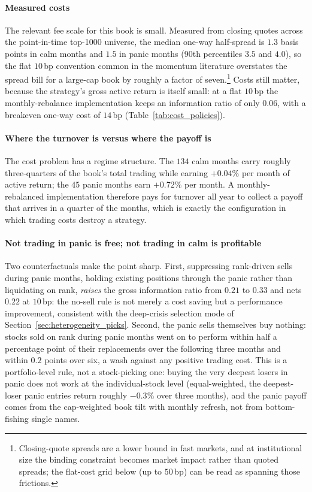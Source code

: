 \paragraph{Measured costs}
The relevant fee scale for this book is small. Measured from closing quotes across the point-in-time top-1000 universe, the median one-way half-spread is $1.3$ basis points in calm months and $1.5$ in panic months (90th percentiles $3.5$ and $4.0$), so the flat $10$\,bp convention common in the momentum literature overstates the spread bill for a large-cap book by roughly a factor of seven.\footnote{Closing-quote spreads are a lower bound in fast markets, and at institutional size the binding constraint becomes market impact rather than quoted spreads; the flat-cost grid below (up to $50$\,bp) can be read as spanning those frictions.} Costs still matter, because the strategy's gross active return is itself small: at a flat $10$\,bp the monthly-rebalance implementation keeps an information ratio of only $0.06$, with a breakeven one-way cost of $14$\,bp (Table~\ref{tab:cost_policies}).

\paragraph{Where the turnover is versus where the payoff is}
The cost problem has a regime structure. The $134$ calm months carry roughly three-quarters of the book's total trading while earning $+0.04\%$ per month of active return; the $45$ panic months earn $+0.72\%$ per month. A monthly-rebalanced implementation therefore pays for turnover all year to collect a payoff that arrives in a quarter of the months, which is exactly the configuration in which trading costs destroy a strategy.

\paragraph{Not trading in panic is free; not trading in calm is profitable}
Two counterfactuals make the point sharp. First, suppressing rank-driven sells during panic months, holding existing positions through the panic rather than liquidating on rank, \emph{raises} the gross information ratio from $0.21$ to $0.33$ and nets $0.22$ at $10$\,bp: the no-sell rule is not merely a cost saving but a performance improvement, consistent with the deep-crisis selection mode of Section~\ref{sec:heterogeneity_picks}. Second, the panic sells themselves buy nothing: stocks sold on rank during panic months went on to perform within half a percentage point of their replacements over the following three months and within $0.2$ points over six, a wash against any positive trading cost. This is a portfolio-level rule, not a stock-picking one: buying the very deepest losers in panic does not work at the individual-stock level (equal-weighted, the deepest-loser panic entries return roughly $-0.3\%$ over three months), and the panic payoff comes from the cap-weighted book tilt with monthly refresh, not from bottom-fishing single names.

